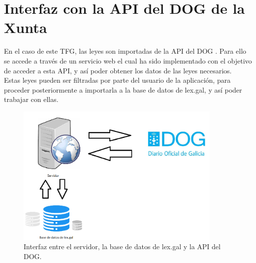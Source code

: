 \section{Interfaz con la API del DOG de la Xunta}

En el caso de este TFG, las leyes son importadas de la API del DOG \cite{dog}. Para ello se accede a través de un servicio web el cual ha sido implementado con el objetivo de acceder a esta API, y así poder obtener los datos de las leyes necesarios.
\\

Estas leyes pueden ser filtradas por parte del usuario de la aplicación, para proceder posteriormente a importarla a la base de datos de lex.gal, y así poder trabajar con ellas.

\begin{figure}[H]
\centerline{\includegraphics[width=10cm]{figuras/interfazDOG.png}}
\caption{Interfaz entre el servidor, la base de datos de lex.gal y la API del DOG.}
\label{enlaceInterfazDOG}
\end{figure}